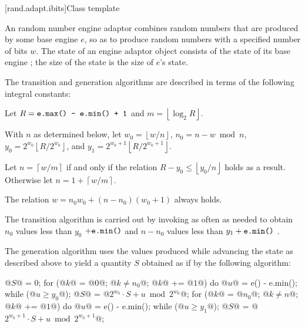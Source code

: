 
[rand.adapt.ibits]{Class template }%
%

\pnum
An 
random number engine adaptor
combines random numbers
that are produced by some base engine $e$,
so as to produce random numbers
with a specified number of bits $w$.
The state%
%
of an 
engine adaptor object 
consists of
 the state  of its base engine ;
the size of the state is
 the size of $e$'s state.

\pnum
The transition and generation algorithms
are described in terms
of the following integral constants:%
\begin{enumeratea}
 \item
   Let
     $ R = \texttt{e.max() - e.min() + 1} $
   and
     $ m = \left\lfloor \log_2 R \right\rfloor $.
 \item
   With $n$ as determined below,
   let
     $ w_0 = \left\lfloor w / n \right\rfloor $,
     $ n_0 = n - w \bmod n $,
     $ y_0 = 2^{w_0} \left\lfloor R / 2^{w_0} \right\rfloor $,
   and
     $ y_1 = 2^{w_0 + 1} \left\lfloor R / 2^{w_0 + 1} \right\rfloor $.
 \item
   Let
     $ n = \left\lceil w / m \right\rceil $
   if and only if the relation
     $ R - y_0 \leq \left\lfloor y_0 / n \right\rfloor $
   holds as a result.
   Otherwise let
     $ n = 1 + \left\lceil w / m \right\rceil $.
\end{enumeratea}
\begin{note}
 The relation
 $ w = n_0 w_0 + (n - n_0)(w_0 + 1) $
 always holds.
\end{note}

\pnum
The transition algorithm%
%
is carried out
by invoking 
as often as needed
to obtain
 $ n_0 $
values less than
$ y_0 $ $ + \texttt{e.min()} $
and
 $ n - n_0 $
values less than $ y_1 + \texttt{e.min()} $%
.

\pnum
The generation algorithm%
%
uses the values produced
while advancing the state as described above
to yield a quantity $S$
obtained as if by the following algorithm:
\begin{codeblock}
@$S$@ = 0;
for (@$k$@ = @$0$@; @$k \neq n_0$@; @$k$@ += @$1$@)  {
 do @$u$@ = e() - e.min(); while (@$ u \ge y_0 $@);
 @$S$@ = @$ 2^{w_0} \cdot S + u \bmod 2^{w_0} $@;
}
for (@$k$@ = @$n_0$@; @$k \neq n$@; @$k$@ += @$1$@)  {
 do @$u$@ = e() - e.min(); while (@$ u \ge y_1 $@);
 @$S$@ = @$ 2^{w_0 + 1} \cdot S + u \bmod 2^{w_0 + 1} $@;
}
\end{codeblock}

